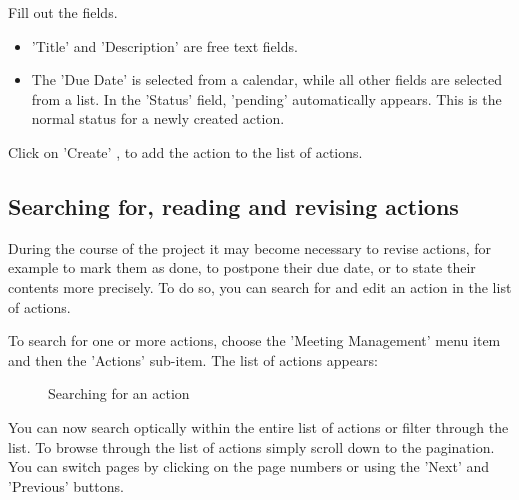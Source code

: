 Fill out the fields.

\begin{itemize}
\item
'Title'  and 'Description'  are free text fields.
\item
The 'Due Date'  is selected from a calendar, while all other fields  are selected from a list. In the 'Status' field, 'pending' automatically appears. This is the normal status for a newly created action.
\end{itemize}
Click on 'Create' , to add the action to the list of actions.

\subsection{Searching for, reading and revising actions}
During the course of the project it may become necessary to revise actions, for example to  mark them as done, to postpone their due date, or to state their contents more precisely. To do so, you can search for and edit an action in the list of actions.

\vspace{\baselineskip}

To search for one or more actions, choose the 'Meeting Management' menu item and then the 'Actions' sub-item. The list of actions appears:

\begin{figure}[H]
\caption{Searching for an action}
\end{figure}

You can now search optically within the entire list of actions or filter through the list. To browse through the list of actions simply scroll down to the pagination. You can switch pages by clicking on the page numbers or using the 'Next' and 'Previous' buttons.

